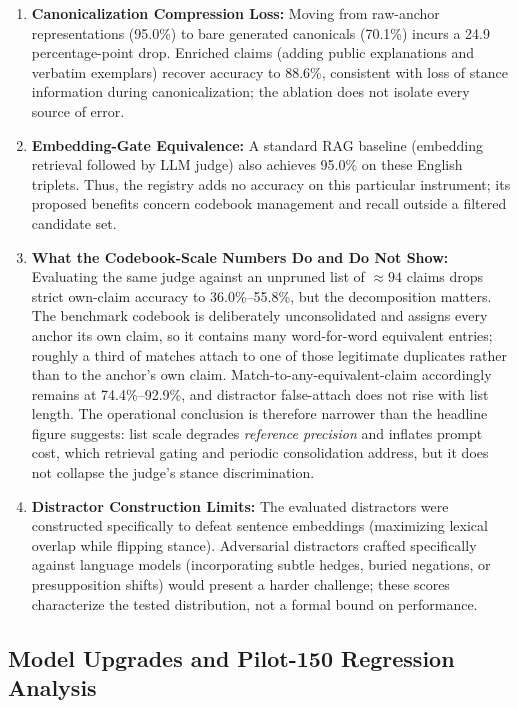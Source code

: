 \documentclass[11pt,a4paper]{article}
\begin{document}
\begin{enumerate}
\item \textbf{Canonicalization Compression Loss:} Moving from raw-anchor representations (95.0\%) to bare generated canonicals (70.1\%) incurs a 24.9 percentage-point drop. Enriched claims (adding public explanations and verbatim exemplars) recover accuracy to 88.6\%, consistent with loss of stance information during canonicalization; the ablation does not isolate every source of error.

\item \textbf{Embedding-Gate Equivalence:} A standard RAG baseline (embedding retrieval followed by LLM judge) also achieves 95.0\% on these English triplets. Thus, the registry adds no accuracy on this particular instrument; its proposed benefits concern codebook management and recall outside a filtered candidate set.

\item \textbf{What the Codebook-Scale Numbers Do and Do Not Show:} Evaluating the same judge against an unpruned list of $\approx 94$ claims drops strict own-claim accuracy to 36.0\%--55.8\%, but the decomposition matters. The benchmark codebook is deliberately unconsolidated and assigns every anchor its own claim, so it contains many word-for-word equivalent entries; roughly a third of matches attach to one of those legitimate duplicates rather than to the anchor's own claim. Match-to-any-equivalent-claim accordingly remains at 74.4\%--92.9\%, and distractor false-attach does not rise with list length. The operational conclusion is therefore narrower than the headline figure suggests: list scale degrades \emph{reference precision} and inflates prompt cost, which retrieval gating and periodic consolidation address, but it does not collapse the judge's stance discrimination.

\item \textbf{Distractor Construction Limits:} The evaluated distractors were constructed specifically to defeat sentence embeddings (maximizing lexical overlap while flipping stance). Adversarial distractors crafted specifically against language models (incorporating subtle hedges, buried negations, or presupposition shifts) would present a harder challenge; these scores characterize the tested distribution, not a formal bound on performance.
\end{enumerate}

\subsection{Model Upgrades and Pilot-150 Regression Analysis}
\end{document}
